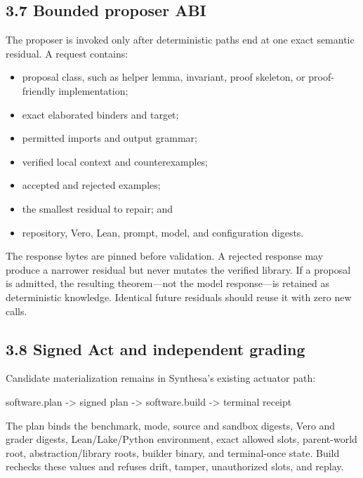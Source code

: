 \documentclass[
  10pt,
]{article}
\newenvironment{Shaded}{}{}
\newcommand{\NormalTok}[1]{#1}
\providecommand{\tightlist}{%
  \setlength{\itemsep}{0pt}\setlength{\parskip}{0pt}}
\begin{document}
\subsection{3.7 Bounded proposer ABI}\label{bounded-proposer-abi}

The proposer is invoked only after deterministic paths end at one exact
semantic residual. A request contains:

\begin{itemize}
\tightlist
\item
  proposal class, such as helper lemma, invariant, proof skeleton, or
  proof-friendly implementation;
\item
  exact elaborated binders and target;
\item
  permitted imports and output grammar;
\item
  verified local context and counterexamples;
\item
  accepted and rejected examples;
\item
  the smallest residual to repair; and
\item
  repository, Vero, Lean, prompt, model, and configuration digests.
\end{itemize}

The response bytes are pinned before validation. A rejected response may
produce a narrower residual but never mutates the verified library. If a
proposal is admitted, the resulting theorem---not the model
response---is retained as deterministic knowledge. Identical future
residuals should reuse it with zero new calls.

\subsection{3.8 Signed Act and independent
grading}\label{signed-act-and-independent-grading}

Candidate materialization remains in Synthesa's existing actuator path:

\begin{Shaded}
\begin{Highlighting}[]
\NormalTok{software.plan {-}\textgreater{} signed plan {-}\textgreater{} software.build {-}\textgreater{} terminal receipt}
\end{Highlighting}
\end{Shaded}

The plan binds the benchmark, mode, source and sandbox digests, Vero and
grader digests, Lean/Lake/Python environment, exact allowed slots,
parent-world root, abstraction/library roots, builder binary, and
terminal-once state. Build rechecks these values and refuses drift,
tamper, unauthorized slots, and replay.
\end{document}
